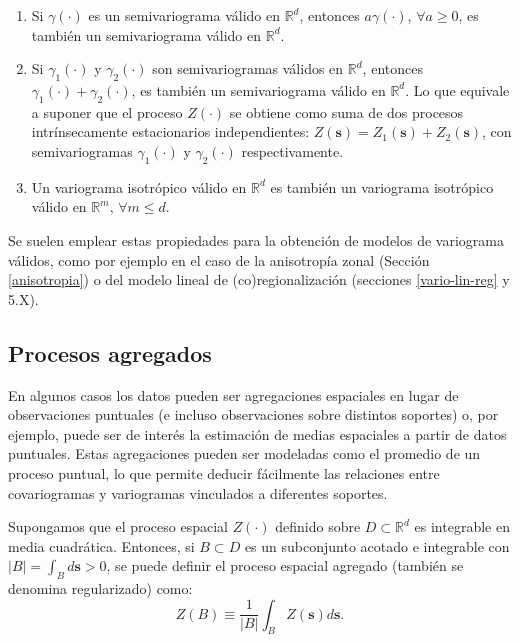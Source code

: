 \documentclass[
  spanish,
]{book}
\theoremstyle{break}
\begin{document}
\begin{enumerate}
\def\labelenumi{\arabic{enumi}.}
\item
  Si \(\gamma (\cdot)\) es un semivariograma válido en \(\mathbb{R}^d\), entonces \(a\gamma (\cdot)\), \(\forall a\geq 0\), es también un semivariograma válido en \(\mathbb{R}^d\).
\item
  Si \(\gamma_1 (\cdot)\) y \(\gamma_2 (\cdot)\) son semivariogramas válidos en \(\mathbb{R}^d\), entonces \(\gamma_1 (\cdot)+\gamma_2 (\cdot)\), es también un semivariograma válido en \(\mathbb{R}^d\). Lo que equivale a suponer que el proceso \(Z(\cdot)\) se obtiene como suma de dos procesos intrínsecamente estacionarios independientes: \(Z(\mathbf{s})=Z_1 (\mathbf{s})+Z_2 (\mathbf{s})\), con semivariogramas \(\gamma_1 (\cdot)\) y \(\gamma_2 (\cdot)\) respectivamente.
\item
  Un variograma isotrópico válido en \(\mathbb{R}^d\) es también un variograma isotrópico válido en \(\mathbb{R}^m\), \(\forall m\leq d\).
\end{enumerate}

Se suelen emplear estas propiedades para la obtención de modelos de variograma válidos, como por ejemplo en el caso de la anisotropía zonal (Sección \ref{anisotropia}) o del modelo lineal de (co)regionalización (secciones \ref{vario-lin-reg} y 5.X).

\hypertarget{procesos-agregados}{%
\subsection{Procesos agregados}\label{procesos-agregados}}

En algunos casos los datos pueden ser agregaciones espaciales en lugar de observaciones puntuales (e incluso observaciones sobre distintos soportes) o, por ejemplo, puede ser de interés la estimación de medias espaciales a partir de datos puntuales.
Estas agregaciones pueden ser modeladas como el promedio de un proceso puntual, lo que permite deducir fácilmente las relaciones entre covariogramas y variogramas vinculados a diferentes soportes.

Supongamos que el proceso espacial \(Z(\cdot)\) definido sobre \(D\subset \mathbb{R} ^{d}\) es integrable en media cuadrática.
Entonces, si \(B\subset D\) es un subconjunto acotado e integrable con \(\left| B\right| =\int_B d\mathbf{s} > 0\), se puede definir el proceso espacial agregado (también se denomina regularizado) como:
\[Z(B)\equiv \dfrac{1}{\left| B\right| } \int_{B}Z(\mathbf{s})d\mathbf{s}.\]
\end{document}
